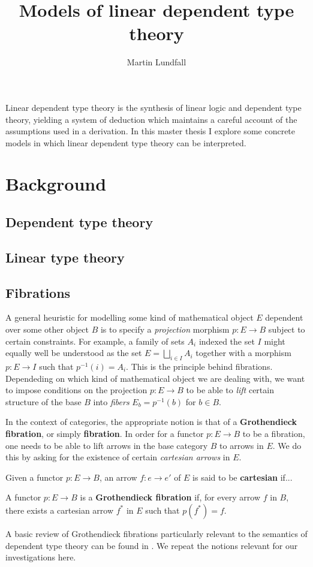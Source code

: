 
\usepackage[margin=0.5in]{geometry}

\title{Models of linear dependent type theory}
\author{Martin Lundfall}
\maketitle
\abstract
Linear dependent type theory is the synthesis of linear logic and dependent type theory, yielding a system of deduction which maintains a careful account of the assumptions used in a derivation. In this master thesis I explore some concrete models in which linear dependent type theory can be interpreted.
\newpage
\tableofcontents
\newpage
\section{Background}
\subsection{Dependent type theory}

\subsection{Linear type theory}
\subsection{Fibrations}
A general heuristic for modelling some kind of mathematical object $E$ dependent over some other object $B$ is to specify a \textit{projection} morphism $p : E \to B$ subject to certain constraints. For example, a family of sets $A_i$ indexed the set $I$ might equally well be understood as the set $E = \bigsqcup_{i \in I}A_i$ together with a morphism $p : E  \to I$ such that $p^{-1}(i) = A_i$. This is the principle behind fibrations. Dependeding on which kind of mathematical object we are dealing with, we want to impose conditions on the projection $p : E \to B$ to be able to \textit{lift} certain structure of the base $B$ into \textit{fibers} $E_b = p^{-1}(b)$ for $b \in B$.


In the context of categories, the appropriate notion is that of a \textbf{Grothendieck fibration}, or simply \textbf{fibration}. In order for a functor $p : E \to B$ to be a fibration, one needs to be able to lift arrows in the base category $B$ to arrows in $E$. We do this by asking for the existence of certain \textit{cartesian arrows} in $E$.
\begin{defn}
Given a functor $p : E \to B$, an arrow $f : e \to e'$ of $E$ is said to be \textbf{cartesian} if...
\end{defn}
\begin{defn}
A functor $p: E \to B$ is a \textbf{Grothendieck fibration} if, for every arrow $f$ in $B$, there exists a cartesian arrow $f^*$ in $E$ such that $p(f^*) = f$.
\end{defn}
A basic review of Grothendieck fibrations particularly relevant to the semantics of dependent type theory can be found in \cite{jacobs}. We repeat the notions relevant for our investigations here.


